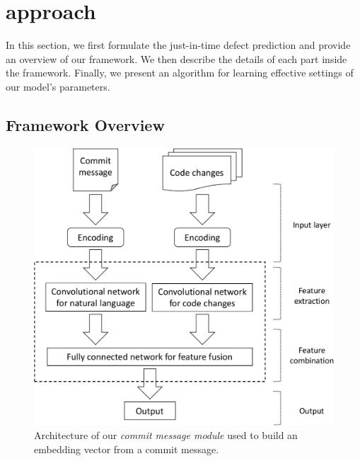 \section{approach}
\label{sec:approach}
In this section, we first formulate the just-in-time defect prediction and provide an overview of our framework. We then describe the details of each part inside the framework. Finally, we present an algorithm for learning effective settings of our model's parameters. 
\subsection{Framework Overview}
\label{sec:overview}

\begin{figure}
\center
\includegraphics[scale=0.36]{figs/framework.pdf}
\caption{Architecture of our \textit{commit message module} used to build an embedding vector from a commit message.}
\label{fig:msg_model}
\vspace{-0.4cm}
\end{figure}

